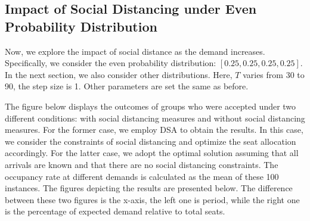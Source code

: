
\subsection{Impact of Social Distancing under Even Probability Distribution}
Now, we explore the impact of social distance as the demand increases. Specifically, we consider the even probability distribution: $[0.25, 0.25, 0.25, 0.25]$. In the next section, we also consider other 
distributions. Here, $T$ varies from 30 to 90, the step size is 1. Other parameters are set the same as before.




The figure below displays the outcomes of groups who were accepted under two different conditions: with social distancing measures and without social distancing measures. For the former case, we employ DSA to obtain the results. In this case, we consider the constraints of social distancing and optimize the seat allocation accordingly. For the latter case, we adopt the optimal solution assuming that all arrivals are known and that there are no social distancing constraints. The occupancy rate at different demands is calculated as the mean of these 100 instances. The figures depicting the results are presented below. The difference between these two figures is the x-axis, the left one is period, while the right one is the percentage of expected demand relative to total seats. 

